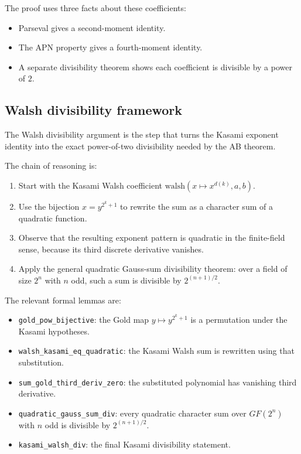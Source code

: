 \documentclass[11pt]{article}
\begin{document}
The proof uses three facts about these coefficients:
\begin{itemize}
  \item Parseval gives a second-moment identity.
  \item The APN property gives a fourth-moment identity.
  \item A separate divisibility theorem shows each coefficient is divisible by a power of $2$.
\end{itemize}

\subsection{Walsh divisibility framework}
The Walsh divisibility argument is the step that turns the Kasami exponent identity into the exact power-of-two divisibility needed by the AB theorem.

The chain of reasoning is:
\begin{enumerate}
  \item Start with the Kasami Walsh coefficient $\mathrm{walsh}(x \mapsto x^{d(k)}, a, b)$.
  \item Use the bijection $x = y^{2^k+1}$ to rewrite the sum as a character sum of a quadratic function.
  \item Observe that the resulting exponent pattern is quadratic in the finite-field sense, because its third discrete derivative vanishes.
  \item Apply the general quadratic Gauss-sum divisibility theorem: over a field of size $2^n$ with $n$ odd, such a sum is divisible by $2^{(n+1)/2}$.
\end{enumerate}

The relevant formal lemmas are:
\begin{itemize}
  \item \texttt{gold\_pow\_bijective}: the Gold map $y \mapsto y^{2^k+1}$ is a permutation under the Kasami hypotheses.
  \item \texttt{walsh\_kasami\_eq\_quadratic}: the Kasami Walsh sum is rewritten using that substitution.
  \item \texttt{sum\_gold\_third\_deriv\_zero}: the substituted polynomial has vanishing third derivative.
  \item \texttt{quadratic\_gauss\_sum\_div}: every quadratic character sum over $GF(2^n)$ with $n$ odd is divisible by $2^{(n+1)/2}$.
  \item \texttt{kasami\_walsh\_div}: the final Kasami divisibility statement.
\end{itemize}
\end{document}
